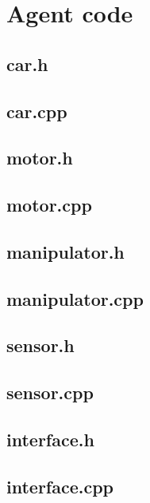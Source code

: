 \documentclass{book}
\begin{document}
\chapter{Agent code}

\section{car.h}

\section{car.cpp}


\section{motor.h}

\section{motor.cpp}


\section{manipulator.h}

\section{manipulator.cpp}


\section{sensor.h}

\section{sensor.cpp}


\section{interface.h}

\section{interface.cpp}

\end{document}
